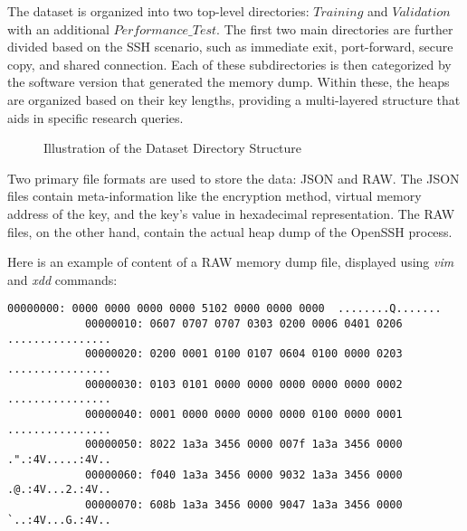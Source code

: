     \begin{minipage}{\dimexpr\linewidth-20pt}
        The dataset is organized into two top-level directories: $Training$ and $Validation$ with an additional $Performance\_Test$. The first two main directories are further divided based on the SSH scenario, such as immediate exit, port-forward, secure copy, and shared connection. Each of these subdirectories is then categorized by the software version that generated the memory dump. Within these, the heaps are organized based on their key lengths, providing a multi-layered structure that aids in specific research queries.

        \begin{figure}[H]
            \centering
            \caption{Illustration of the Dataset Directory Structure}
            \label{fig:dataset_structure}
            \begin{minipage}{0.6\textwidth}
        \end{minipage}
        \end{figure}
    \end{minipage}

    Two primary file formats are used to store the data: JSON and RAW. The JSON files contain meta-information like the encryption method, virtual memory address of the key, and the key's value in hexadecimal representation. The RAW files, on the other hand, contain the actual heap dump of the OpenSSH process.

    \begin{minipage}{\dimexpr\linewidth-20pt}
        Here is an example of content of a RAW memory dump file, displayed using \textit{vim} and \textit{xdd} commands:

        \begin{lstlisting}[style=hexdump, caption={16 bytes per line visualization of a Hex Dump from \textit{Training/basic/V\_7\_8\_P1/16/5070-1643978841-heap.raw}}]
            00000000: 0000 0000 0000 0000 5102 0000 0000 0000  ........Q.......
            00000010: 0607 0707 0707 0303 0200 0006 0401 0206  ................
            00000020: 0200 0001 0100 0107 0604 0100 0000 0203  ................
            00000030: 0103 0101 0000 0000 0000 0000 0000 0002  ................
            00000040: 0001 0000 0000 0000 0000 0100 0000 0001  ................
            00000050: 8022 1a3a 3456 0000 007f 1a3a 3456 0000  .".:4V.....:4V..
            00000060: f040 1a3a 3456 0000 9032 1a3a 3456 0000  .@.:4V...2.:4V..
            00000070: 608b 1a3a 3456 0000 9047 1a3a 3456 0000  `..:4V...G.:4V..
        \end{lstlisting}
    \end{minipage}

